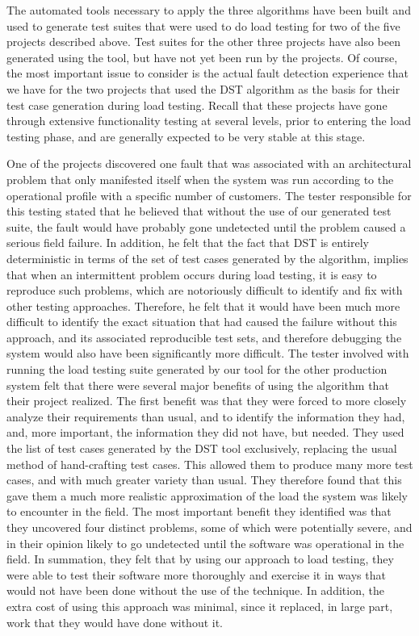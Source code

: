 \documentclass[journal, twoside]{IEEEtran}
\begin{document}
The automated tools necessary to apply the three algorithms
have been built and used to generate test suites that were used
to do load testing for two of the five projects described above.
Test suites for the other three projects have also been generated using the tool, but have not yet been run by the projects.
Of course, the most important issue to consider is the actual
fault detection experience that we have for the two projects
that used the DST algorithm as the basis for their test case
generation during load testing. Recall that these projects have
gone through extensive functionality testing at several levels,
prior to entering the load testing phase, and are generally expected to be very stable at this stage.

One of the projects discovered one fault that was associated
with an architectural problem that only manifested itself when
the system was run according to the operational profile with a
specific number of customers. The tester responsible for this
testing stated that he believed that without the use of our generated test suite, the fault would have probably gone undetected until the problem caused a serious field failure. In addition, he felt that the fact that DST is entirely deterministic in
terms of the set of test cases generated by the algorithm, implies that when an intermittent problem occurs during load
testing, it is easy to reproduce such problems, which are notoriously difficult to identify and fix with other testing approaches. Therefore, he felt that it would have been much
more difficult to identify the exact situation that had caused the
failure without this approach, and its associated reproducible
test sets, and therefore debugging the system would also have
been significantly more difficult. 
The tester involved with running the load testing suite generated by our tool for the other production system felt that
there were several major benefits of using the algorithm that
their project realized. The first benefit was that they were
forced to more closely analyze their requirements than usual,
and to identify the information they had, and, more important,
the information they did not have, but needed. They used the
list of test cases generated by the DST tool exclusively, replacing the usual method of hand-crafting test cases. This allowed
them to produce many more test cases, and with much greater
variety than usual. They therefore found that this gave them a
much more realistic approximation of the load the system was
likely to encounter in the field. The most important benefit
they identified was that they uncovered four distinct problems,
some of which were potentially severe, and in their opinion
likely to go undetected until the software was operational in
the field. In summation, they felt that by using our approach to
load testing, they were able to test their software more thoroughly and exercise it in ways that would not have been done
without the use of the technique. In addition, the extra cost of
using this approach was minimal, since it replaced, in large
part, work that they would have done without it. 
\end{document}
